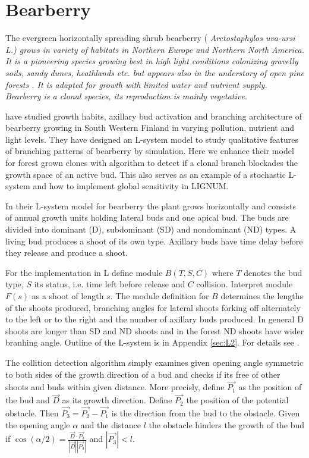 \section{Bearberry}\label{sec:bearberry}

The   evergreen   horizontally    spreading   shrub   bearberry   (\it
Arctostaphylos  uva-ursi \rm  L.)   grows in  variety  of habitats  in
Northern  Europe  and Northern  North  America.   It  is a  pioneering
species  growing best  in  high light  conditions colonizing  gravelly
soils,  sandy  dunes,  heathlands   etc.   but  appears  also  in  the
understory of open pine forests \citep{salemaa:99}.  It is adapted for
growth with limited water and  nutrient supply.  Bearberry is a clonal
species, its reproduction is mainly vegetative.

\citet{salemaa:02} have studied growth habits, axillary bud activation
and  branching  architecture of  bearberry  growing  in South  Western
Finland in  varying pollution, nutrient  and light levels.   They have
designed an L-system model  to study qualitative features of branching
patterns of bearberry by simulation.   Here we enhance their model for
forest  grown clones  with  algorithm  to detect  if  a clonal  branch
blockades the  growth space of an  active bud. This also  serves as an
example of  a stochastic L-system  \citep{pp:96} and how  to implement
global sensitivity \citep{kurth:94} in LIGNUM.

In  their L-system  model for  bearberry \citep{salemaa:02}  the plant
grows horizontally and consists of annual growth units holding lateral
buds  and one apical  bud.  The  buds are  divided into  dominant (D),
subdominant (SD) and nondominant (ND)  types.  A living bud produces a
shoot  of its  own type.  Axillary buds  have time  delay  before they
release and produce a shoot.

For the implementation in L define module $B(T,S,C)$ where $T$ denotes
the bud type,  $S$ its status, i.e.  time left  before release and $C$
collision.  Interpret  module $F(s)$  as a shoot  of length  $s$.  The
module  definition  for  $B$  determines  the lengths  of  the  shoots
produced, branching angles for  lateral shoots forking off alternately
to the left or to the  right and the number of axillary buds produced.
In general D shoots are longer than SD and ND shoots and in the forest
ND shoots  have wider branhing angle.   Outline of the  L-system is in
Appendix \ref{sec:L2}.  For details see \citet{salemaa:02}.

The collition detection algorithm  simply examines given opening angle
symmetric to both sides of the growth direction of a bud and checks if
its  free  of other  shoots  and  buds  within given  distance.   More
precisly, define $\vec {P_1}$ as the  position of the bud and $\vec D$
as  its growth  direction. Define  $\vec  {P_2}$ the  position of  the
potential obstacle. Then $\vec {P_3} = \vec {P_2} - \vec {P_1}$ is the
direction  from the  bud  to  the obstacle.  Given  the opening  angle
$\alpha$ and the  distance $l$ the obstacle hinders  the growth of the
bud  if $\cos(\alpha/2) =  \frac{{\vec D}  \cdot {\vec  {P_3}}} {|\vec
  D||\vec {P_3}|}$ and $|\vec {P_3}| < l$.

